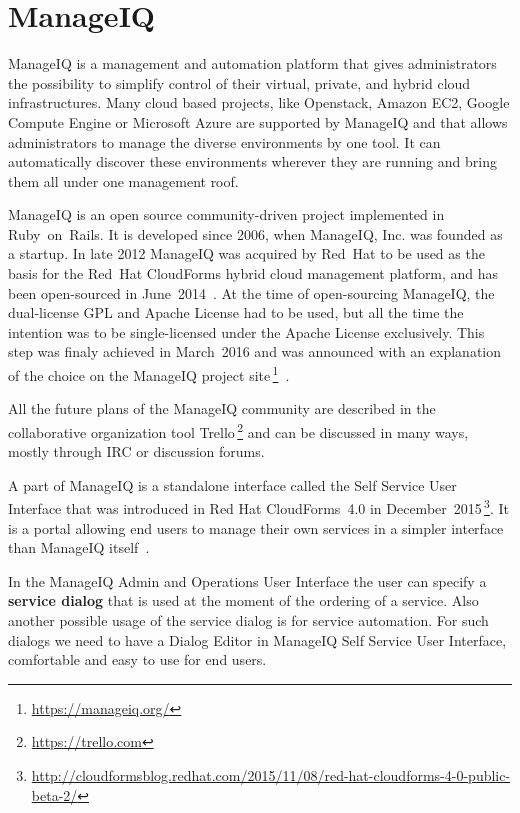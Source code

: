 \chapter{ManageIQ}\label{ch:manageiq}

ManageIQ is a management and automation platform that gives administrators
the possibility to simplify control of their virtual, private, and hybrid cloud
infrastructures.
Many cloud based projects, like Openstack, Amazon EC2, Google Compute Engine
or Microsoft Azure are supported by ManageIQ and that allows administrators to
manage the diverse environments by one tool.
It can automatically discover these environments wherever they are running
and bring them all under one management roof.~\cite{lwnMiq}

ManageIQ is an open source community-driven project implemented in
Ruby~on~Rails.
It is developed since 2006, when ManageIQ, Inc. was founded as a startup.
In late 2012 ManageIQ was acquired by Red~Hat to be used as the basis for the
Red~Hat CloudForms hybrid cloud management platform, and has been open-sourced
in June~2014~\cite{opensourcedMiq}.
At the time of open-sourcing ManageIQ, the dual-license GPL and Apache License
had to be used, but all the time the intention was to be single-licensed under
the Apache License exclusively.
This step was finaly achieved in March~2016 and was announced with an
explanation of the choice on the ManageIQ project
site\,\footnote{\url{https://manageiq.org/}}~\cite{licenseChange}.

All the future plans of the ManageIQ community are described in the
collaborative organization tool Trello\,\footnote{\url{https://trello.com}} and
can be discussed in many ways, mostly through IRC or discussion forums.

A part of ManageIQ is a standalone interface called the
Self Service User Interface that was introduced in Red Hat CloudForms~4.0
in December~2015\,\footnote{\url{http://cloudformsblog.redhat.com/2015/11/08/red-hat-cloudforms-4-0-public-beta-2/}}.
It is a portal allowing end users to manage their own services in a simpler
interface than ManageIQ itself~\cite{capablancaMiq}.

In the ManageIQ Admin and Operations User Interface the user can specify a
{\bf service dialog} that is used at the moment of the ordering of a service.
Also another possible usage of the service dialog is for service automation.
For such dialogs we need to have a Dialog Editor in ManageIQ Self Service
User Interface, comfortable and easy to use for end users.

